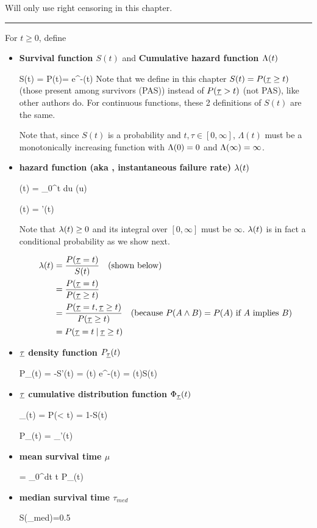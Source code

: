Will only use right censoring in this chapter.
\hrule
For $t\geq 0$, define
\begin{itemize}
\item {\bf Survival function $S(t)$}
and {\bf Cumulative hazard function $\Lambda(t)$}

\beq
S(t) = P(\rvtau \geq t)= e^{-\Lam(t)}
\eeq
Note that we define in this chapter
 $S(t) = P({\underline{\tau}}\geq t)$ (those present among survivors (PAS))
instead of $P({\underline{\tau}} > t)$ (not PAS), like other authors do. For
continuous functions,
these 2 definitions of $S(t)$
are the same.

Note that,
since $S(t)$
is a probability and $t, \tau \in [0, \infty]$,
$\Lambda(t)$ must be a monotonically increasing function with
$\Lambda(0)=0$ and $\Lambda(\infty) = \infty$.

\item {\bf hazard function
(aka , instantaneous failure rate) $\lambda(t)$}

\beq
\Lam(t) = \int_0^t  du\; \lam(u)
\eeq

\beq
\lam(t) = \Lam'(t)
\eeq

Note that $\lambda(t)\geq 0$
and its integral over $[0,\infty]$
must be $\infty$.
$\lambda(t)$ is in fact a conditional probability
as we show next.

\begin{align}
\lambda(t) &=
\frac{P({\underline{\tau}}=t)}{S(t)} \quad \text{(shown below)}
\\
&=
\frac{P({\underline{\tau}}=t)}{P({\underline{\tau}}\geq t)}
\\
&=
\frac{P({\underline{\tau}}=t, {\underline{\tau}}\geq t)}{P({\underline{\tau}}\geq t)}
\quad\text{(because $P(A \wedge B) = P(A)$ if $A$ implies $B$)}
\\
&=
P({\underline{\tau}}=t{\:\mathbf{|}\:} {\underline{\tau}}\geq t)
\end{align}


\item {\bf ${\underline{\tau}}$ density function $P_{\underline{\tau}}(t)$}

\beq
P_\rvtau(t) = -S'(t) = \lam(t) e^{-\Lam(t)} =
\lam(t)S(t)
\eeq

\item {\bf ${\underline{\tau}}$ cumulative distribution function
$\Phi_{\underline{\tau}}(t)$}

\beq
\Phi_\rvtau(t) = P(\rvtau< t) = 1-S(t)
\eeq

\beq
P_\rvtau(t) = \Phi_\rvtau'(t)
\eeq

\item {\bf mean survival time $\mu$}

\beq
\mu= \int_0^\infty dt\; t P_\rvtau(t)
\eeq

\item {\bf median survival time $\tau_{med}$}

\beq
S(\tau_{med})=0.5
\eeq

\end{itemize}

